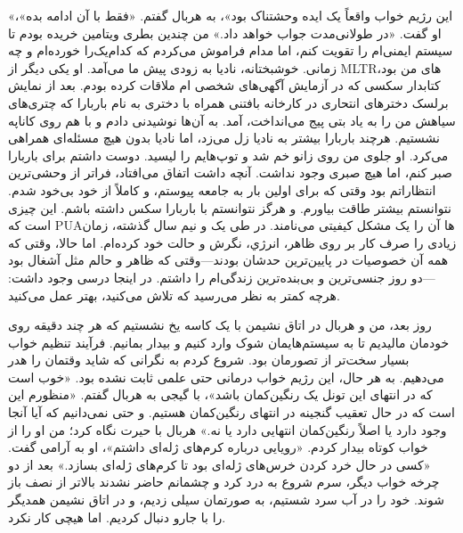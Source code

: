 «این رژیم خواب واقعاً یک ایده وحشتناک بود»، به هربال گفتم.  
«فقط با آن ادامه بده»، او گفت. «در طولانی‌مدت جواب خواهد داد.» من چندین بطری ویتامین خریده بودم تا سیستم ایمنی‌ام را تقویت کنم، اما مدام فراموش می‌کردم که کدام‌یک‌را خورده‌ام و چه زمانی. خوشبختانه، نادیا به زودی پیش ما می‌آمد. او یکی دیگر از MLTRهای من بود، کتابدار سکسی که در آزمایش آگهی‌های شخصی ام ملاقات کرده بودم. بعد از نمایش برلسک دخترهای انتحاری در کارخانه بافتنی همراه با دختری به نام باربارا که چتری‌های سیاهش من را به یاد بتی پیج می‌انداخت، آمد.  
به آن‌ها نوشیدنی دادم و با هم روی کاناپه نشستیم. هرچند باربارا بیشتر به نادیا زل می‌زد، اما نادیا بدون هیچ مسئله‌ای همراهی می‌کرد. او جلوی من روی زانو خم شد و توپ‌هایم را لیسید. دوست داشتم برای باربارا صبر کنم، اما هیچ صبری وجود نداشت. آنچه داشت اتفاق می‌افتاد، فراتر از وحشی‌ترین انتظاراتم بود وقتی که برای اولین بار به جامعه پیوستم، و کاملاً از خود بی‌خود شدم. نتوانستم بیشتر طاقت بیاورم. و هرگز نتوانستم با باربارا سکس داشته باشم. این چیزی است که PUAها آن را یک مشکل کیفیتی می‌نامند. در طی یک و نیم سال گذشته، زمان زیادی را صرف کار بر روی ظاهر، انرژي، نگرش و حالت خود کرده‌ام. اما حالا، وقتی که همه آن خصوصیات در پایین‌ترین حدشان بودند—وقتی که ظاهر و حالم مثل آشغال بود—دو روز جنسی‌ترین و بی‌بنده‌ترین زندگی‌ام را داشتم. در اینجا درسی وجود داشت: هرچه کمتر به نظر می‌رسید که تلاش می‌کنید، بهتر عمل می‌کنید.  

روز بعد، من و هربال در اتاق نشیمن با یک کاسه یخ نشستیم که هر چند دقیقه روی خودمان مالیدیم تا به سیستم‌هایمان شوک وارد کنیم و بیدار بمانیم. فرآیند تنظیم خواب بسیار سخت‌تر از تصورمان بود. شروع کردم به نگرانی که شاید وقتمان را هدر می‌دهیم. به هر حال، این رژیم خواب درمانی حتی علمی ثابت نشده بود.  
«خوب است که در انتهای این تونل یک رنگین‌کمان باشد»، با گیجی به هربال گفتم. «منظورم این است که در حال تعقیب گنجینه در انتهای رنگین‌کمان هستیم. و حتی نمی‌دانیم که آیا آنجا وجود دارد یا اصلاً رنگین‌کمان انتهایی دارد یا نه.» هربال با حیرت نگاه کرد؛ من او را از خواب کوتاه بیدار کردم. «رویایی درباره کرم‌های ژله‌ای داشتم»، او به آرامی گفت. «کسی در حال خرد کردن خرس‌های ژله‌ای بود تا کرم‌های ژله‌ای بسازد.» بعد از دو چرخه خواب دیگر، سرم شروع به درد کرد و چشمانم حاضر نشدند بالاتر از نصف باز شوند. خود را در آب سرد شستیم، به صورتمان سیلی زدیم، و در اتاق نشیمن همدیگر را با جارو دنبال کردیم. اما هیچی کار نکرد.